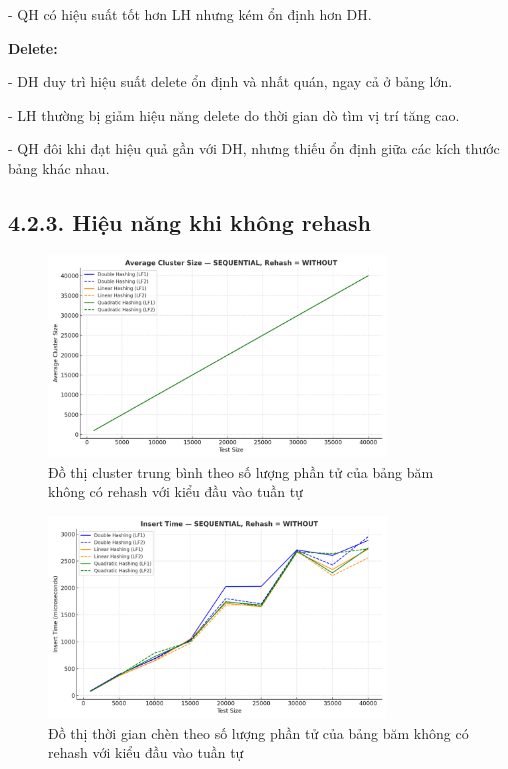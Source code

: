 \documentclass[12pt,a4paper]{report}
\begin{document}
-	QH có hiệu suất tốt hơn LH nhưng kém ổn định hơn DH.

	\textbf{Delete:}
    
-	DH duy trì hiệu suất delete ổn định và nhất quán, ngay cả ở bảng lớn.

-	LH thường bị giảm hiệu năng delete do thời gian dò tìm vị trí tăng cao.

-	QH đôi khi đạt hiệu quả gần với DH, nhưng thiếu ổn định giữa các kích thước bảng khác nhau.
\newpage
\subsection*{4.2.3. Hiệu năng khi không rehash}

\begin{figure}[!ht]
    \centering
    \includegraphics[width=0.8\textwidth]{seq_clus_not.png}
    \caption{Đồ thị cluster trung bình theo số lượng phần tử của bảng băm không có rehash với kiểu đầu vào tuần tự}
    \label{fig:flowchart}
\end{figure}

\begin{figure}[!ht]
    \centering
    \includegraphics[width=0.8\textwidth]{seq_ins_not.png}
    \caption{Đồ thị thời gian chèn theo số lượng phần tử của bảng băm không có rehash với kiểu đầu vào tuần tự}
    \label{fig:flowchart}
\end{figure}
\end{document}
